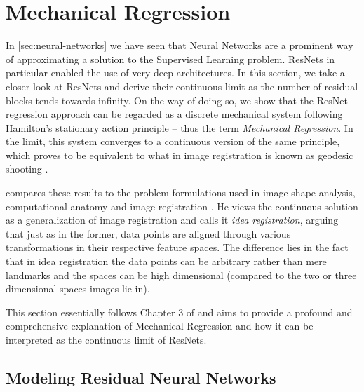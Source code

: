 \section{Mechanical Regression}
\label{sec:mechanical-regression}

In \cref{sec:neural-networks} we have seen that Neural Networks are a prominent way of approximating a solution to the Supervised Learning problem.
ResNets in particular enabled the use of very deep architectures.
In this section, we take a closer look at ResNets and derive their continuous limit as the number of residual blocks tends towards infinity.
On the way of doing so, we show that the ResNet regression approach can be regarded as a discrete mechanical system following Hamilton's stationary action principle -- thus the term \emph{Mechanical Regression}.
In the limit, this system converges to a continuous version of the same principle, which proves to be equivalent to what in image registration is known as geodesic shooting \cite{allassonniere05}.

\citet{owhadi20} compares these results to the problem formulations used in image shape analysis, computational anatomy and image registration \cite{bibid}.
He views the continuous solution as a generalization of image registration and calls it \emph{idea registration}, arguing that just as in the former, data points are aligned through various transformations in their respective feature spaces.
The difference lies in the fact that in idea registration the data points can be arbitrary rather than mere landmarks and the spaces can be high dimensional (compared to the two or three dimensional spaces images lie in).

This section essentially follows Chapter 3 of \cite{owhadi20} and aims to provide a profound and comprehensive explanation of Mechanical Regression and how it can be interpreted as the continuous limit of ResNets.
\subsection{Modeling Residual Neural Networks}

